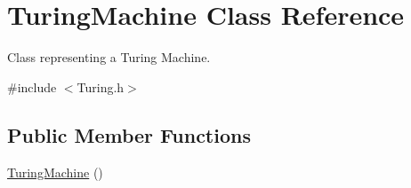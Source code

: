 \hypertarget{class_turing_machine}{\section{Turing\-Machine Class Reference}
\label{class_turing_machine}
}


Class representing a Turing Machine.  




{\ttfamily \#include $<$Turing.\-h$>$}

\subsection*{Public Member Functions}
\begin{DoxyCompactItemize}
\item 
\hypertarget{class_turing_machine_aaadc700a58793d77a1121de6cc070c74}{\hyperlink{class_turing_machine_aaadc700a58793d77a1121de6cc070c74}{Turing\-Machine} ()}\label{class_turing_machine_aaadc700a58793d77a1121de6cc070c74}


\end{DoxyCompactItemize}
